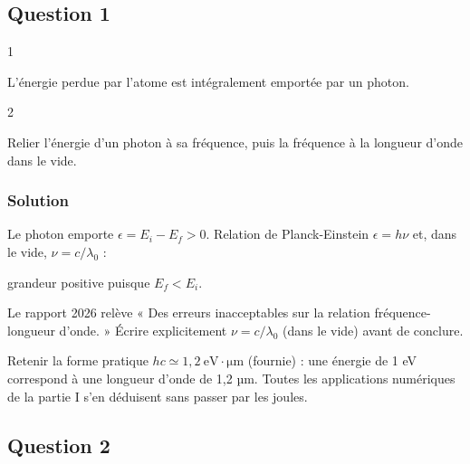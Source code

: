 \documentclass[11pt,a4paper]{article}
\newcommand{\equationajustee}[1]{%
  \sbox{\boiteequation}{$\displaystyle #1$}%
  \ifdim\wd\boiteequation>\linewidth
    \[\resizebox{\linewidth}{!}{\usebox{\boiteequation}}\]%
  \else
    \[#1\]%
  \fi}
\begin{document}
\hypertarget{question-1}{%
\subsection{Question 1}\label{question-1}}

\begin{indication}{1}

L'énergie perdue par l'atome est intégralement emportée par un photon.

\end{indication}

\begin{indication}{2}

Relier l'énergie d'un photon à sa fréquence, puis la fréquence à la longueur d'onde dans le vide.

\end{indication}

\hypertarget{solution}{%
\subsubsection{Solution}\label{solution}}

Le photon emporte \(\epsilon=E_i-E_f>0\). Relation de Planck-Einstein \(\epsilon=h\nu\) et, dans le vide, \(\nu=c/\lambda_0\) :

\equationajustee{\boxed{\lambda_0=\frac{hc}{E_i-E_f}}}

grandeur positive puisque \(E_f<E_i\).

\begin{jury}

Le rapport 2026 relève « Des erreurs inacceptables sur la relation fréquence-longueur d'onde. » Écrire explicitement \(\nu=c/\lambda_0\) (dans le vide) avant de conclure.

\end{jury}

\begin{methode}

Retenir la forme pratique \(hc\simeq1{,}2\ \mathrm{eV\cdot\mu m}\) (fournie) : une énergie de 1 eV correspond à une longueur d'onde de 1,2 µm. Toutes les applications numériques de la partie I s'en déduisent sans passer par les joules.

\end{methode}

\hypertarget{question-2}{%
\subsection{Question 2}\label{question-2}}
\end{document}
